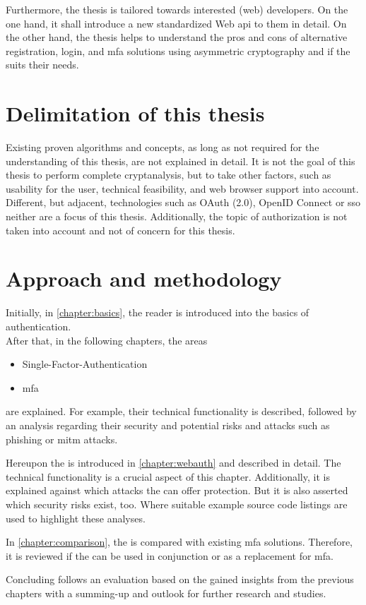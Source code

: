 Furthermore, the thesis is tailored towards interested (web) developers. On the one hand, it shall introduce a new standardized Web \gls{api} to them in detail. On the other hand, the thesis helps to understand the pros and cons of alternative registration, login, and \gls{mfa} solutions using asymmetric cryptography and if the \wa{} suits their needs.

\section{Delimitation of this thesis}

Existing proven algorithms and concepts, as long as not required for the understanding of this thesis, are not explained in detail. It is not the goal of this thesis to perform complete cryptanalysis, but to take other factors, such as usability for the user, technical feasibility, and web browser support into account. Different, but adjacent, technologies such as OAuth (2.0), OpenID Connect or \gls{sso} neither are a focus of this thesis. Additionally, the topic of authorization is not taken into account and not of concern for this thesis. 

\section{Approach and methodology}

Initially, in \autoref{chapter:basics}, the reader is introduced into the basics of authentication.\\
After that, in the following chapters, the areas

\begin{itemize}
	\item Single-Factor-Authentication
	\item \gls{mfa}
\end{itemize}

are explained. For example, their technical functionality is described, followed by an analysis regarding their security and potential risks and attacks such as phishing or \gls{mitm} attacks.

Hereupon the \wa{} is introduced in \autoref{chapter:webauth} and described in detail. The technical functionality is a crucial aspect of this chapter. Additionally, it is explained against which attacks the \wa{} can offer protection. But it is also asserted which security risks exist, too. Where suitable example source code listings are used to highlight these analyses.%

In \autoref{chapter:comparison}, the \wa{} is compared with existing \gls{mfa} solutions. Therefore, it is reviewed if the \wa{} can be used in conjunction or as a replacement for \gls{mfa}.

Concluding follows an evaluation based on the gained insights from the previous chapters with a summing-up and outlook for further research and studies.
